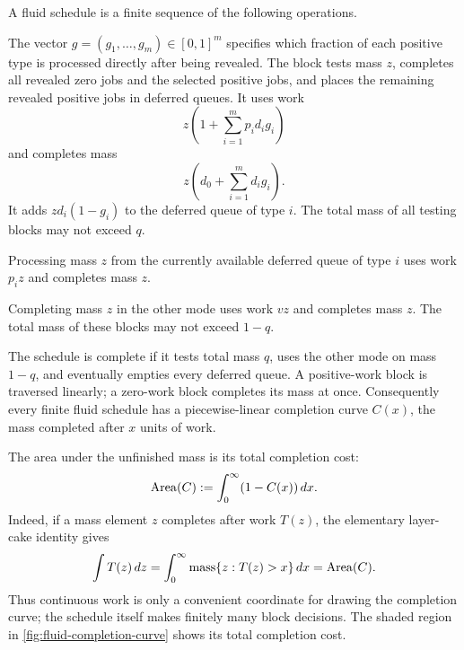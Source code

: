 A fluid schedule is a finite sequence of the following operations.

\begin{description}[leftmargin=*,style=nextline]
 \item[Testing block of mass $z$ with selector $g$.]
 The vector $g=(g_1,\ldots,g_m)\in[0,1]^m$ specifies which fraction of each
 positive type is processed directly after being revealed.  The block tests
 mass $z$, completes all revealed zero jobs and the selected positive jobs,
 and places the remaining revealed positive jobs in deferred queues.  It
 uses work
 \[
   z\left(1+\sum_{i=1}^m p_i d_i g_i\right)
 \]
 and completes mass
 \[
   z\left(d_0+\sum_{i=1}^m d_i g_i\right).
 \]
 It adds $zd_i(1-g_i)$ to the deferred queue of type $i$.  The total mass of
 all testing blocks may not exceed $q$.

 \item[Deferred-processing block of type $i$.]
 Processing mass $z$ from the currently available deferred queue of type
 $i$ uses work $p_i z$ and completes mass $z$.

 \item[Alternative-completion block.]
 Completing mass $z$ in the other mode uses work $vz$ and completes mass
 $z$.  The total mass of these blocks may not exceed $1-q$.
\end{description}

The schedule is complete if it tests total mass $q$, uses the other mode on
mass $1-q$, and eventually empties every deferred queue.  A positive-work
block is traversed linearly; a zero-work block completes its mass at once.
Consequently every finite fluid schedule has a piecewise-linear completion
curve $C(x)$, the mass completed after $x$ units of work.

The area under the unfinished mass is its total completion cost:
\begin{equation}
 \operatorname{Area}(C)\mathrel{:=}\int_0^\infty(1-C(x))\,dx.
 \label{eq:completion-curve-area}
\end{equation}
Indeed, if a mass element $z$ completes after work $T(z)$, the elementary
layer-cake identity gives
\[
 \int T(z)\,dz
 =\int_0^\infty \operatorname{mass}\{z:T(z)>x\}\,dx
 =\operatorname{Area}(C).
\]
Thus continuous work is only a convenient coordinate for drawing the
completion curve; the schedule itself makes finitely many block decisions.
The shaded region in \cref{fig:fluid-completion-curve} shows its total
completion cost.

